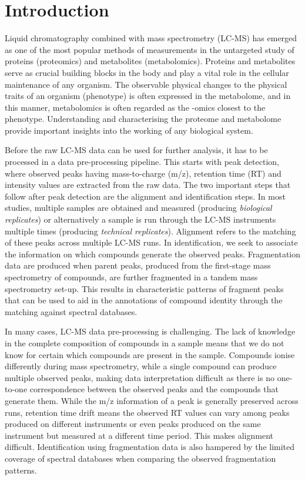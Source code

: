 \chapter{Introduction}
\label{c:intro}

Liquid chromatography combined with mass spectrometry (LC-MS) has emerged as one of the most popular methods of measurements in the untargeted study of proteins (proteomics) and metabolites (metabolomics). Proteins and metabolites serve as crucial building blocks in the body and play a vital role in the cellular maintenance of any organism. The observable physical changes to the physical traits of an organism (phenotype) is often expressed in the metabolome, and in this manner, metabolomics is often regarded as the -omics closest to the phenotype. Understanding and characterising the proteome and metabolome provide important insights into the working of any biological system.

Before the raw LC-MS data can be used for further analysis, it has to be processed in a data pre-processing pipeline. This starts with peak detection, where observed peaks having mass-to-charge (m/z), retention time (RT) and intensity values are extracted from the raw data. The two important steps that follow after peak detection are the alignment and identification steps. In most studies, multiple samples are obtained and measured (producing \emph{biological replicates}) or alternatively a sample is run through the LC-MS instruments multiple times (producing \emph{technical replicates}). Alignment refers to the matching of these peaks across multiple LC-MS runs. In identification, we seek to associate the information on which compounds generate the observed peaks. Fragmentation data are produced when parent peaks, produced from the first-stage mass spectrometry of compounds, are further fragmented in a tandem mass spectrometry set-up. This results in characteristic patterns of fragment peaks that can be used to aid in the annotations of compound identity through the matching against spectral databases. 

In many cases, LC-MS data pre-processing is challenging. The lack of knowledge in the complete composition of compounds in a sample means that we do not know for certain which compounds are present in the sample. Compounds ionise differently during mass spectrometry, while a single compound can produce multiple observed peaks, making data interpretation difficult as there is no one-to-one correspondence between the observed peaks and the compounds that generate them. While the m/z information of a peak is generally preserved across runs, retention time drift means the observed RT values can vary among peaks produced on different instruments or even peaks produced on the same instrument but measured at a different time period. This makes alignment difficult. Identification using fragmentation data is also hampered by the limited coverage of spectral databases when comparing the observed fragmentation patterns. 

